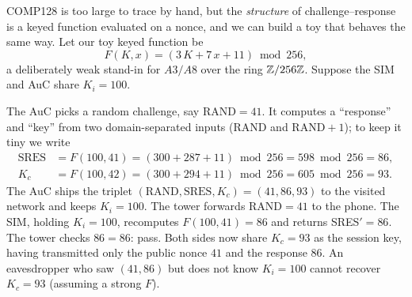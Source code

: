 COMP128 is too large to trace by hand, but the \emph{structure} of challenge--response is a keyed function evaluated on a nonce, and we can build a toy that behaves the same way. Let our toy keyed function be
\[
  F(K,x) = (3\,K + 7\,x + 11) \bmod 256,
\]
a deliberately weak stand-in for $A3/A8$ over the ring $\mathbb{Z}/256\mathbb{Z}$. Suppose the SIM and AuC share $K_i = 100$.

The AuC picks a random challenge, say $\text{RAND} = 41$. It computes a ``response'' and ``key'' from two domain-separated inputs ($\text{RAND}$ and $\text{RAND}+1$); to keep it tiny we write
\begin{align*}
  \text{SRES} &= F(100, 41) = (300 + 287 + 11)\bmod 256 = 598 \bmod 256 = 86, \\
  K_c &= F(100, 42) = (300 + 294 + 11)\bmod 256 = 605 \bmod 256 = 93.
\end{align*}
The AuC ships the triplet $(\text{RAND}, \text{SRES}, K_c) = (41, 86, 93)$ to the visited network and keeps $K_i=100$. The tower forwards $\text{RAND}=41$ to the phone. The SIM, holding $K_i=100$, recomputes $F(100,41)=86$ and returns SRES$'=86$. The tower checks $86 = 86$: pass. Both sides now share $K_c = 93$ as the session key, having transmitted only the public nonce $41$ and the response $86$. An eavesdropper who saw $(41, 86)$ but does not know $K_i=100$ cannot recover $K_c = 93$ (assuming a strong $F$).

